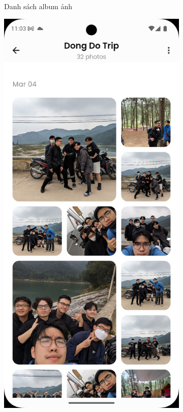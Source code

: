 \begin{figure}[H]
\begin{subfigure}{0.32\textwidth}
        \caption{Danh sách album ảnh}
    \end{subfigure}
    \hfill
    \begin{subfigure}{0.32\textwidth}
        \includegraphics[width=1\linewidth]{figures/c4/4-2/album_2.png} 

\end{subfigure}
\end{figure}
